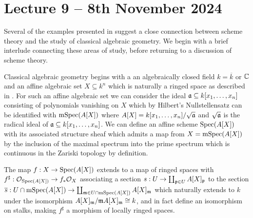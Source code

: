 \section{Lecture 9 -- 8th November 2024}\label{sec: lecture 9}
Several of the examples presented in  suggest a close connection between scheme theory and the study of classical algebraic geometry. We begin with a brief interlude connecting these areas of study, before returning to a discussion of scheme theory. 

Classical algebraic geometry begins with a an algebraically closed field $k=\overline{k}$ or $\mathbb{C}$ and an affine algebraic set $X\subseteq k^{n}$ which is naturally a ringed space as described in . For such an affine algebraic set we can consider the ideal $\mathfrak{a}\subseteq k[x_{1},\dots,x_{n}]$ consisting of polynomials vanishing on $X$ which by Hilbert's Nullstellensatz can be identified with $\mathrm{mSpec}(A[X])$ where $A[X]=k[x_{1},\dots,x_{n}]/\sqrt{\mathfrak{a}}$ and $\sqrt{\mathfrak{a}}$ is the radical ideal of $\mathfrak{a}\subseteq k[x_{1},\dots,x_{n}]$. We can define an affine scheme $\operatorname{Spec}(A[X])$ with its associated structure sheaf which admits a map from $X=\mathrm{mSpec}(A[X])$ by the inclusion of the maximal spectrum into the prime spectrum which is continuous in the Zariski topology by definition. 

The map $f:X\to\operatorname{Spec}(A[X])$ extends to a map of ringed spaces with $f^{\sharp}:\mathcal{O}_{\operatorname{Spec}(A[X])}\to f_{*}\mathcal{O}_{X}$ associating a section $s:U\to\coprod_{\mathfrak{p}\in U}A[X]_{\mathfrak{p}}$ to the section $\overline{s}:U\cap\mathrm{mSpec}(A[X])\to\coprod_{\mathfrak{m}\in U\cap\mathrm{mSpec}(A[X])}A[X]_{\mathfrak{m}}$ which naturally extends to $k$ under the isomorphism $A[X]_{\mathfrak{m}}/\mathfrak{m} A[X]_{\mathfrak{m}}\cong k$, and in fact define an isomorphism on stalks, making $f^{\sharp}$ a morphism of locally ringed spaces. 

